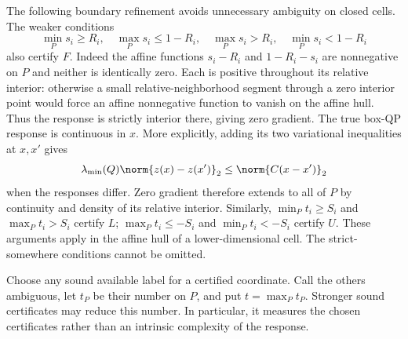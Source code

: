 The following boundary refinement avoids unnecessary ambiguity on closed
cells. The weaker conditions
\begin{equation}\label{eq:screening-closure-free}
 \min_Ps_i\ge R_i,\quad \max_Ps_i\le1-R_i,\quad
 \max_Ps_i>R_i,\quad \min_Ps_i<1-R_i
\end{equation}
also certify $F$. Indeed the affine functions $s_i-R_i$ and
$1-R_i-s_i$ are nonnegative on $P$ and neither is identically zero.
Each is positive throughout its relative interior: otherwise a small
relative-neighborhood segment through a zero interior point would force
an affine nonnegative function to vanish on the affine hull. Thus the
response is strictly interior there, giving zero gradient. The true
box-QP response is continuous in $x$. More explicitly, adding its two
variational inequalities at $x,x'$ gives
\[
 \lambda_{\min}(Q)\norm{z(x)-z(x')}_2
                               \le\norm{C(x-x')}_2
\]
when the responses differ. Zero gradient therefore extends to all of
$P$ by continuity and density of its relative interior.
Similarly, $\min_Pt_i\ge S_i$ and $\max_Pt_i>S_i$ certify $L$;
$\max_Pt_i\le-S_i$ and $\min_Pt_i<-S_i$ certify $U$.
These arguments apply in the affine hull of a lower-dimensional cell.
The strict-somewhere conditions cannot be omitted.

Choose any sound available label for a certified coordinate. Call the
others ambiguous, let $t_P$ be their number on $P$, and put
$t=\max_Pt_P$. Stronger sound certificates may reduce this number.
In particular, it measures the chosen certificates rather than an
intrinsic complexity of the response.

